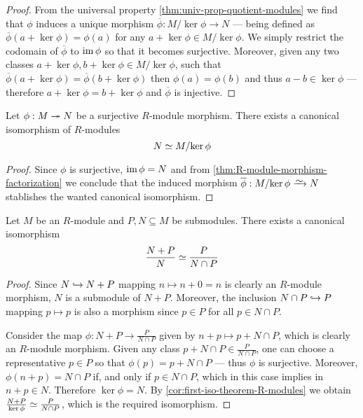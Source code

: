 \begin{proof}
From the universal property \cref{thm:univ-prop-quotient-modules} we find that
\(\phi\) induces a unique morphism \(\overline{\phi}: M/{\ker \phi} \to N\) ---
being defined as \(\overline{\phi}(a + \ker \phi) = \phi(a)\) for any
\(a + \ker \phi \in M/{\ker \phi}\). We simply restrict the codomain of
\(\overline{\phi}\) to \(\operatorname{im} \phi\) so that it becomes surjective. Moreover,
given any two classes \(a + \ker \phi, b + \ker \phi \in M/{\ker \phi}\), such
that \(\overline{\phi}(a + \ker \phi) = \overline{\phi}(b + \ker \phi)\) then
\(\phi(a) = \phi(b)\) and thus \(a - b \in \ker \phi\) --- therefore \(a + \ker
\phi = b + \ker \phi\) and \(\overline{\phi}\) is injective.
\end{proof}

\begin{corollary}
\label{cor:first-iso-theorem-R-modules}
Let \(\phi: M \twoheadrightarrow N\) be a surjective \(R\)-module morphism. There exists a
canonical isomorphism of \(R\)-modules
\[
N \simeq M/{\ker \phi}
\]
\end{corollary}

\begin{proof}
Since \(\phi\) is surjective, \(\operatorname{im} \phi = N\) and from
\cref{thm:R-module-morphism-factorization} we conclude that the induced morphism
\(\overline{\phi}: M/{\ker \phi} \isoto N\) stablishes the wanted canonical
isomorphism.
\end{proof}

\begin{proposition}
\label{prop:second-iso-R-mod}
Let \(M\) be an \(R\)-module and \(P, N \subseteq M\) be submodules. There
exists a canonical isomorphism
\[
\frac{N + P}{N} \simeq \frac{P}{N \cap P}
\]
\end{proposition}

\begin{proof}
Since \(N \hookrightarrow N + P\) mapping \(n \mapsto n + 0 = n\) is clearly an
\(R\)-module morphism, \(N\) is a submodule of \(N + P\). Moreover, the
inclusion \(N \cap P \hookrightarrow P\) mapping \(p \mapsto p\) is also a morphism since
\(p \in P\) for all \(p \in N \cap P\).

Consider the map \(\phi: N + P \to \frac{P}{N \cap P}\) given by
\(n + p \mapsto p + N \cap P\), which is clearly an \(R\)-module morphism. Given
any class \(p + N \cap P \in \frac{P}{N \cap P}\), one can choose a
representative \(p \in P\) so that \(\phi(p) = p + N \cap P\) --- thus \(\phi\)
is surjective. Moreover, \(\phi(n + p) = N \cap P\) if, and only if
\(p \in N \cap P\), which in this case implies in \(n + p \in N\). Therefore
\(\ker \phi = N\). By \cref{cor:first-iso-theorem-R-modules} we obtain
\(\frac{N + P}{\ker \phi} \simeq \frac{P}{N \cap P}\), which is the required
isomorphism.
\end{proof}

